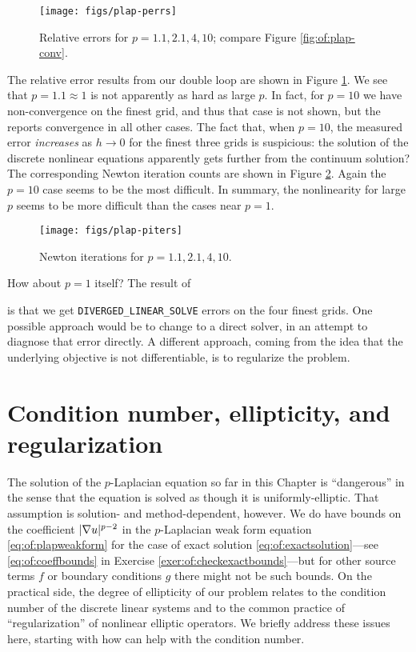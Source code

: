 \begin{figure}
\texttt{[image: figs/plap-perrs]}
\caption{Relative errors for $p=1.1,2.1,4,10$; compare Figure \ref{fig:of:plap-conv}.}
\label{fig:of:plap-perrs}
\end{figure}

The relative error results from our double loop are shown in Figure \ref{fig:of:plap-perrs}.  We see that $p = 1.1 \approx 1$ is not apparently as hard as large $p$.  In fact, for $p=10$ we have non-convergence on the finest grid, and thus that case is not shown, but the \pSNES reports convergence in all other cases.  The fact that, when $p=10$, the measured error \emph{increases} as $h\to 0$ for the finest three grids is suspicious: the solution of the discrete nonlinear equations apparently gets further from the continuum solution?  The corresponding Newton iteration counts are shown in Figure \ref{fig:of:plap-piters}.  Again the $p=10$ case seems to be the most difficult.  In summary, the nonlinearity for large $p$ seems to be more difficult than the cases near $p=1$.

\begin{figure}
\texttt{[image: figs/plap-piters]}
\caption{Newton iterations for $p=1.1,2.1,4,10$.}
\label{fig:of:plap-piters}
\end{figure}

How about $p=1$ itself?  The result of
is that we get \texttt{DIVERGED\_LINEAR\_SOLVE} errors on the four finest grids.  One possible approach would be to change to a direct solver, in an attempt to diagnose that error directly.  A different approach, coming from the idea that the underlying objective is not differentiable, is to regularize the problem.


\section{Condition number, ellipticity, and regularization}  \label{page:of:regularization}

The solution of the $p$-Laplacian equation so far in this Chapter is ``dangerous'' in the sense that the equation is solved as though it is uniformly-elliptic.  That assumption is solution- and method-dependent, however.  We do have bounds on the coefficient $|\nabla u|^{p-2}$ in the $p$-Laplacian weak form equation \eqref{eq:of:plapweakform} for the case of exact solution \eqref{eq:of:exactsolution}---see \eqref{eq:of:coeffbounds} in Exercise \ref{exer:of:checkexactbounds}---but for other source terms $f$ or boundary conditions $g$ there might not be such bounds.  On the practical side, the degree of ellipticity of our problem relates to the condition number of the discrete linear systems and to the common practice of ``regularization'' of nonlinear elliptic operators.  We briefly address these issues here, starting with how \PETSc can help with the condition number.

